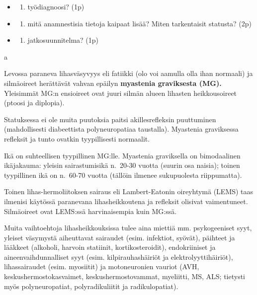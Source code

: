 \documentclass[
]{book}
\providecommand{\tightlist}{%
  \setlength{\itemsep}{0pt}\setlength{\parskip}{0pt}}
\begin{document}
\begin{itemize}
\tightlist
\item
  \begin{enumerate}
  \def\labelenumi{\alph{enumi}.}
  \tightlist
  \item
    työdiagnoosi? (1p)
  \end{enumerate}
\item
  \begin{enumerate}
  \def\labelenumi{\alph{enumi}.}
  \setcounter{enumi}{1}
  \tightlist
  \item
    mitä anamnestisia tietoja kaipaat lisää? Miten tarkentaisit statusta? (2p)
  \end{enumerate}
\item
  \begin{enumerate}
  \def\labelenumi{\alph{enumi}.}
  \setcounter{enumi}{2}
  \tightlist
  \item
    jatkosuunnitelma? (1p)
  \end{enumerate}
\end{itemize}

a

Levossa paraneva lihasväsyvyys eli fatiikki (olo voi aamulla olla ihan normaali) ja silmäoireet herättävät vahvan epäilyn \textbf{myastenia graviksesta (MG).} Yleisimmät MG:n ensioireet ovat juuri silmän alueen lihasten heikkousoireet (ptoosi ja diplopia).

Statuksessa ei ole muita puutoksia paitsi akillesrefleksin puuttuminen (mahdollisesti diabeettista polyneuropatiaa taustalla). Myastenia graviksessa refleksit ja tunto ovatkin tyypillisesti normaalit.

Ikä on suhteellisen tyypillinen MG:lle. Myastenia graviksella on bimodaalinen ikäjakauma: yleisin sairastumisikä n.~20-30 vuotta (suurin osa naisia); toinen tyypillinen ikä on n.~60-70 vuotta (tällöin ilmenee sukupuolesta riippumatta).

Toinen lihas-hermoliitoksen sairaus eli Lambert-Eatonin oireyhtymä (LEMS) taas ilmenisi käytössä paranevana lihasheikkoutena ja refleksit olisivat vaimentuneet. Silmäoireet ovat LEMS:ssä harvinaisempia kuin MG:ssä.

Muita vaihtoehtoja lihasheikkouksissa tulee aina miettiä mm. psykogeeniset syyt, yleiset väsymystä aiheuttavat sairaudet (esim. infektiot, syövät), päihteet ja lääkkeet (alkoholi, harvoin statiinit, kortikosteroidit), endokriiniset ja aineenvaihdunnalliset syyt (esim. kilpirauhashäiriöt ja elektrolyyttihäiriöt), lihassairaudet (esim. myosiitit) ja motoneuronien vauriot (AVH, keskushermostokasvaimet, keskushermostovammat, myeliitti, MS, ALS; tietysti myös polyneuropatiat, polyradikuliitit ja radikulopatiat).
\end{document}
